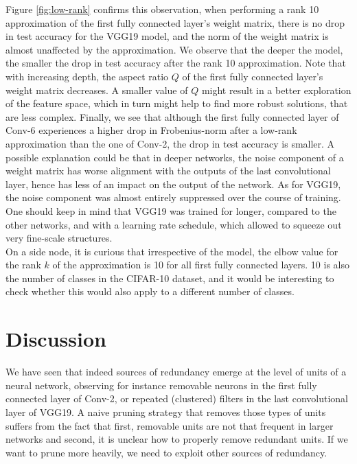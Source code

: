 Figure \ref{fig:low-rank} confirms this observation, when performing a rank 10 approximation of the first fully connected layer's weight matrix, there is no drop in test accuracy for the VGG19 model, and the norm of the weight matrix is almost unaffected by the approximation. We observe that the deeper the model, the smaller the drop in test accuracy after the rank 10 approximation. Note that with increasing depth, the aspect ratio $Q$ of the first fully connected layer's weight matrix decreases. A smaller value of $Q$ might result in a better exploration of the feature space, which in turn might help to find more robust solutions, that are less complex. Finally, we see that although the first fully connected layer of Conv-6 experiences a higher drop in Frobenius-norm after a low-rank approximation than the one of Conv-2, the drop in test accuracy is smaller. A possible explanation could be that in deeper networks, the noise component of a weight matrix has worse alignment with the outputs of the last convolutional layer, hence has less of an impact on the output of the network. As for VGG19, the noise component was almost entirely suppressed over the course of training. One should keep in mind that VGG19 was trained for longer, compared to the other networks, and with a learning rate schedule, which allowed to squeeze out very fine-scale structures. \\

On a side node, it is curious that irrespective of the model, the elbow value for the rank $k$ of the approximation is 10 for all first fully connected layers. 10 is also the number of classes in the CIFAR-10 dataset, and it would be interesting to check whether this would also apply to a different number of classes. \\

\section{Discussion}

We have seen that indeed sources of redundancy emerge at the level of units of a neural network, observing for instance removable neurons in the first fully connected layer of Conv-2, or repeated (clustered) filters in the last convolutional layer of VGG19. A naive pruning strategy that removes those types of units suffers from the fact that first, removable units are not that frequent in larger networks and second, it is unclear how to properly remove redundant units. If we want to prune more heavily, we need to exploit other sources of redundancy. \\

